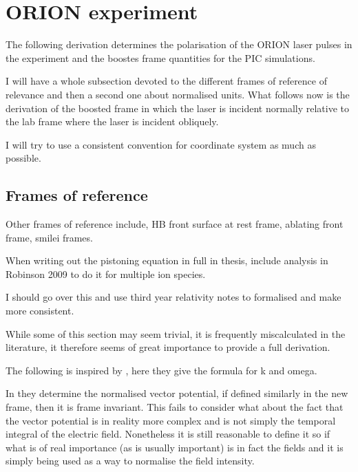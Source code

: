 \section{ORION experiment} 
The following derivation determines the polarisation of the ORION laser pulses in the experiment and the boostes frame quantities for the PIC simulations.

I will have a whole subsection devoted to the different frames of reference of relevance and then a second one about normalised units. What follows now is the derivation of the boosted frame in which the laser is incident normally relative to the lab frame where the laser is incident obliquely.

I will try to use a consistent convention for coordinate system as much as possible.

\subsection{Frames of reference}
Other frames of reference include, HB front surface at rest frame, ablating front frame, smilei frames. 

When writing out the pistoning equation in full in thesis, include analysis in Robinson 2009 to do it for multiple ion species.



I should go over this and use third year relativity notes to formalised and make more consistent.

While some of this section may seem trivial, it is frequently miscalculated in the literature, it therefore seems of great importance to provide a full derivation.

The following is inspired by \cite{bourdierObliqueIncidenceStrong1983}, here they give the formula for k and omega.

In \cite{bourdierDynamicsChargedParticle2001} they determine the normalised vector potential, if defined similarly in the new frame, then it is frame invariant. This fails to consider what about the fact that the vector potential is in reality more complex and is not simply the temporal integral of the electric field. Nonetheless it is still reasonable to define it so if what is of real importance (as is usually important) is in fact the fields and it is simply being used as a way to normalise the field intensity.

